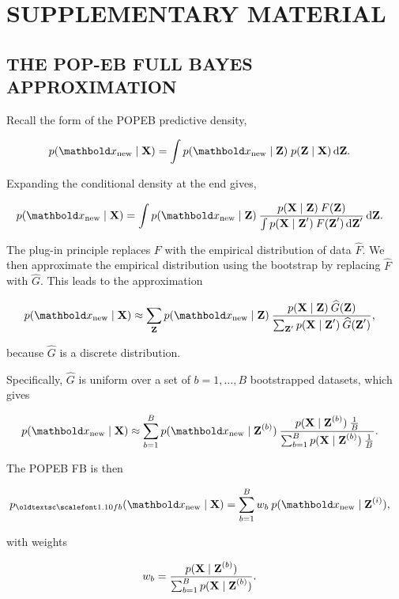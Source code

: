 
\clearpage
\glsresetall
\section*{SUPPLEMENTARY MATERIAL}

\subsection*{THE POP-EB FULL BAYES APPROXIMATION\hspace*{-20pt}}

Recall the form of the \gls{POPEB} predictive density,
\begin{linenomath}
\begin{align*}
  p(\xnew\mid\mbX)
  &=
  \int
  p(\xnew\mid\mbZ) \; p(\mbZ\mid\mbX) \dif\mbZ.
\end{align*}
\end{linenomath}
Expanding the conditional density at the end gives,
\begin{linenomath}
\begin{align*}
  p(\xnew\mid\mbX)
  &=
  \int
  p(\xnew\mid\mbZ)
  \:
  \frac{p(\mbX\mid \mbZ)\:F(\mbZ)}
  {\int p(\mbX\mid \mbZ^\prime)\:F(\mbZ^\prime)\dif\mbZ^\prime}
  \dif\mbZ.
\end{align*}
\end{linenomath}
The plug-in principle replaces $F$ with the empirical distribution of data
$\widehat{F}$. We then approximate the empirical distribution using the
bootstrap by replacing $\widehat{F}$ with $\widehat{G}$. This leads to the
approximation
\begin{linenomath}
\begin{align*}
  p(\xnew\mid\mbX)
  &\approx
  \sum_{\mbZ}
  p(\xnew\mid\mbZ)
  \:
  \frac{p(\mbX\mid \mbZ)\:\widehat{G}(\mbZ)}
  {\sum_{\mbZ^\prime} p(\mbX\mid \mbZ^\prime)\:\widehat{G}(\mbZ^\prime)},
\end{align*}
\end{linenomath}
because $\widehat{G}$ is a discrete distribution.

Specifically, $\widehat{G}$ is uniform over a set of $b = 1,\ldots,B$
bootstrapped datasets, which gives
\begin{linenomath}
\begin{align*}
  p(\xnew\mid\mbX)
  &\approx
  \sum_{b=1}^B
  p(\xnew\mid\mbZ^{(b)})
  \:
  \frac{p(\mbX\mid \mbZ^{(b)})\:\frac{1}{B}}
  {\sum_{b=1}^B p(\mbX\mid \mbZ^{(b)})\:\frac{1}{B}}.
\end{align*}
\end{linenomath}
The \gls{POPEB} \gls{FB} is then
\begin{linenomath}
\begin{align*}
  p_{\textsc{fb}}(\xnew\mid\mbX)
  &=
  \sum_{b=1}^{B} w_b \: p(\xnew \mid \mbZ^{(i)}),
\end{align*}
\end{linenomath}
with weights
\begin{linenomath}
\begin{align*}
  w_b
  &=
  \frac{p(\textbf{X}\mid \textbf{Z}^{(b)})}{\sum_{b=1}^B p(\textbf{X}\mid \textbf{Z}^{(b)})}.
\end{align*}
\end{linenomath}

